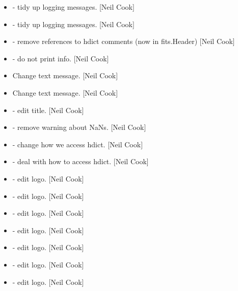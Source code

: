 \documentclass[a4paper,10pt,english]{report}
\begin{document}
\begin{itemize}
\item {} 
 - tidy up logging messages. {[}Neil Cook{]}

\item {} 
 - tidy up logging messages. {[}Neil Cook{]}

\item {} 
 - remove references to hdict comments (now in fits.Header)
{[}Neil Cook{]}

\item {} 
 - do not print info. {[}Neil Cook{]}

\item {} 
Change text message. {[}Neil Cook{]}

\item {} 
Change text message. {[}Neil Cook{]}

\item {} 
 - edit title. {[}Neil Cook{]}

\item {} 
 - remove warning about NaNs. {[}Neil Cook{]}

\item {} 
 - change how we access hdict. {[}Neil Cook{]}

\item {} 
 - deal with how to access hdict. {[}Neil Cook{]}

\item {} 
 - edit logo. {[}Neil Cook{]}

\item {} 
 - edit logo. {[}Neil Cook{]}

\item {} 
 - edit logo. {[}Neil Cook{]}

\item {} 
 - edit logo. {[}Neil Cook{]}

\item {} 
 - edit logo. {[}Neil Cook{]}

\item {} 
 - edit logo. {[}Neil Cook{]}

\item {} 
 - edit logo. {[}Neil Cook{]}


\end{itemize}
\end{document}
